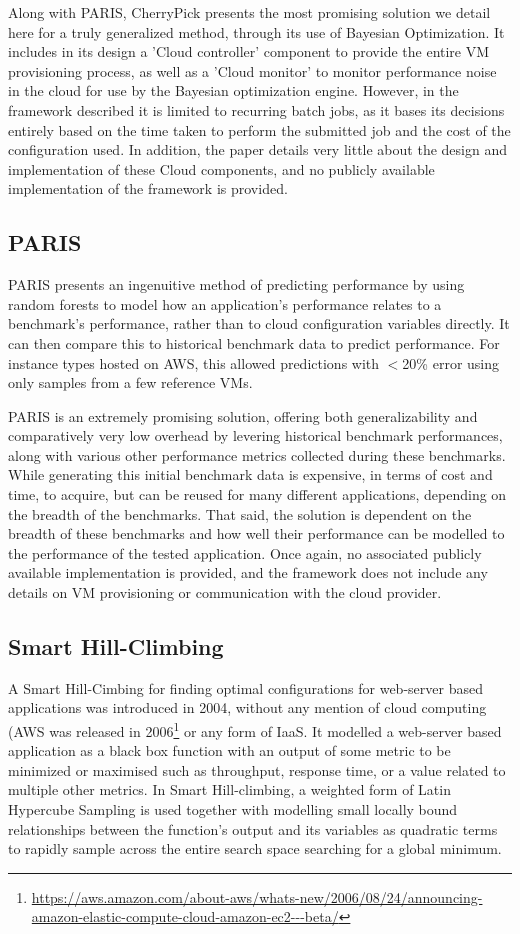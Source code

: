 \documentclass{report}
\begin{document}
Along with PARIS, CherryPick presents the most promising solution we detail here for a truly generalized method, through its use of Bayesian Optimization. It includes in its design a 'Cloud controller' component to provide the entire VM provisioning process, as well as a 'Cloud monitor' to monitor performance noise in the cloud for use by the Bayesian optimization engine. However, in the framework described it is limited to recurring batch jobs, as it bases its decisions entirely based on the time taken to perform the submitted job and the cost of the configuration used. In addition, the paper details very little about the design and implementation of these Cloud components, and no publicly available implementation of the framework is provided.

\subsection{PARIS}
PARIS \cite{Yadwadkar2017} presents an ingenuitive method of predicting performance by using random forests to model how an application's performance relates to a benchmark's performance, rather than to cloud configuration variables directly. It can then compare this to historical benchmark data to predict performance.  For instance types hosted on AWS, this allowed predictions with $<$20\% error using only samples from a few reference VMs.

PARIS is an extremely promising solution, offering both generalizability and comparatively very low overhead by levering historical benchmark performances, along with various other performance metrics collected during these benchmarks. While generating this initial benchmark data is expensive, in terms of cost and time, to acquire, but can be reused for many different applications, depending on the breadth of the benchmarks. That said, the solution is dependent on the breadth of these benchmarks and how well their performance can be modelled to the performance of the tested application. Once again, no associated publicly available implementation is provided, and the framework does not include any details on VM provisioning or communication with the cloud provider.

\subsection{Smart Hill-Climbing}
A Smart Hill-Cimbing for finding optimal configurations for web-server based applications was introduced in 2004\cite{Xi2004}, without any mention of cloud computing (AWS was released in 2006\footnote{\url{https://aws.amazon.com/about-aws/whats-new/2006/08/24/announcing-amazon-elastic-compute-cloud-amazon-ec2---beta/}} or any form of IaaS. It modelled a web-server based application as a black box function with an output of some metric to be minimized or maximised such as throughput, response time, or a value related to multiple other metrics. In Smart Hill-climbing, a weighted form of Latin Hypercube Sampling\cite{McKay2000} is used together with modelling small locally bound relationships between the function's output and its variables as quadratic terms to rapidly sample across the entire search space searching for a global minimum.
\end{document}
